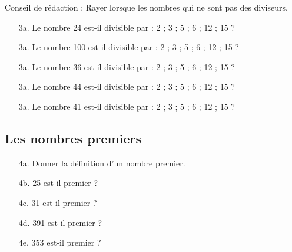 Conseil de rédaction : Rayer lorsque les nombres qui ne sont pas des diviseurs.

\begin{enumerate}
  \item[3a.] Le nombre 24 est-il divisible par : 2 ; 3 ; 5 ; 6 ; 12 ; 15 ?
  \item[3a.] Le nombre 100 est-il divisible par : 2 ; 3 ; 5 ; 6 ; 12 ; 15 ?
  \item[3a.] Le nombre 36 est-il divisible par : 2 ; 3 ; 5 ; 6 ; 12 ; 15 ?
  \item[3a.] Le nombre 44 est-il divisible par : 2 ; 3 ; 5 ; 6 ; 12 ; 15 ?
  \item[3a.] Le nombre 41 est-il divisible par : 2 ; 3 ; 5 ; 6 ; 12 ; 15 ?
\end{enumerate}

\subsection*{Les nombres premiers}

\begin{enumerate}
  \item[4a.] Donner la définition d'un nombre premier. 
  \item[4b.] 25 est-il premier ?
  \item[4c.] 31 est-il premier ?
  \item[4d.] 391 est-il premier ?
  \item[4e.] 353 est-il premier ? 
\end{enumerate}


